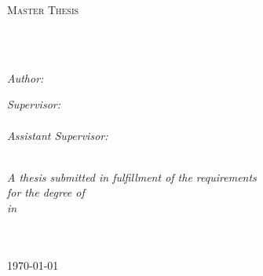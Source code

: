 \documentclass[
12pt, %
oneside, %
english, %
onehalfspacing, %
parskip, %
headsepline, %
chapterinoneline, %
]{MastersDoctoralThesis} %
\author{Xhoni \textsc{Robo}} %
\begin{document}
\frontmatter %

\pagestyle{plain} %


\begin{titlepage}
\begin{center}

\vspace*{.01\textheight}
{\scshape\LARGE \univname\par}\vspace{1.5cm} %
\textsc{\Large Master Thesis}\\[0.5cm] %

\HRule \\[0.4cm] %
{\huge \bfseries \ttitle\par}\vspace{0.4cm} %
\HRule \\[1.5cm] %
 
\begin{minipage}[t]{0.4\textwidth}
\begin{flushleft} \large
\emph{Author:}\\
{\authorname} %
\end{flushleft}
\end{minipage}
\begin{minipage}[t]{0.4\textwidth}
\begin{flushright} \large
\emph{Supervisor:} \\
{\supname} \\ %
\emph{Assistant Supervisor:} \\
{\examname} %
\end{flushright}
\end{minipage}\\[1.5cm]


\large \textit{A thesis submitted in fulfillment of the requirements\\ for the degree of \degreename}\\[0.3cm] %
\textit{in}\\[0.4cm]
\groupname\\\facname\\[1cm] %
 
\vfill

{\large \today}\\[2cm] %
 
\vfill
\end{center}
\end{titlepage}
\end{document}

